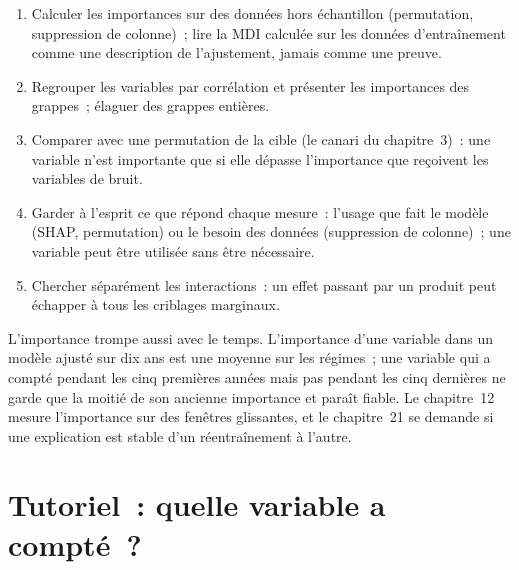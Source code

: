 \begin{method}\label{met:ml:importance:reading}
\begin{enumerate}
\item Calculer les importances sur des données hors échantillon (permutation, suppression de colonne)~; lire la MDI calculée sur les données d'entraînement
comme une description de l'ajustement, jamais comme une preuve.
\item Regrouper les variables par corrélation et présenter les importances des grappes~; élaguer des grappes entières.
\item Comparer avec une permutation de la cible (le canari du chapitre~3)~: une variable n'est importante que si elle dépasse
l'importance que reçoivent les variables de bruit.
\item Garder à l'esprit ce que répond chaque mesure~: l'usage que fait le modèle (SHAP, permutation) ou le besoin des données
(suppression de colonne)~; une variable peut être utilisée sans être nécessaire.
\item Chercher séparément les interactions~: un effet passant par un produit peut échapper à tous les criblages marginaux.
\end{enumerate}
\end{method}

L'importance trompe aussi avec le temps. L'importance d'une variable dans un modèle ajusté sur dix ans est une moyenne sur les régimes~; une
variable qui a compté pendant les cinq premières années mais pas pendant les cinq dernières ne garde que la moitié de son ancienne importance et paraît
fiable. Le chapitre~12 mesure l'importance sur des fenêtres glissantes, et le chapitre~21 se demande si une explication est stable
d'un réentraînement à l'autre.

\section{Tutoriel~: quelle variable a compté~?}\label{tut:ml:feature-engineering-selection-and-importance:tut}

